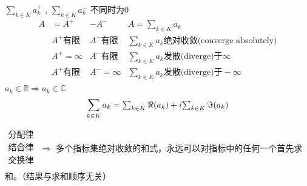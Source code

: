 \documentclass[mode=geye]{elegantnote}
\newcommand\tikznode[3][]%
{\tikz[remember picture,baseline=(#2.base)]
	\node[minimum size=0pt,inner sep=0pt,#1](#2){#3};%
}
\begin{document}
$ \sum_{k\in K} a_k^+ $ ,
$ \sum_{k\in K} a_k^- $ 不同时为0
\begin{equation*}
    \begin{array}{llll}
        A &= A^+ &- A^- & A =  \sum_{k\in K} a_k \\ 
          &A^+\text{有限} & A^-\text{有限}& \sum_{k\in K} a_k \text{绝对收敛(converge absolutely)} \\
          &A^+=\infty & A^-\text{有限}& \sum_{k\in K} a_k \text{发散(diverge)于}\infty \\
          &A^+\text{有限} & A^-=\infty& \sum_{k\in K} a_k \text{发散(diverge)于}-\infty \\
    \end{array}
\end{equation*}
$ a_k\in\mathbb{R} \Rightarrow a_k\in\mathbb{C} $ 
\begin{equation*}
    \sum_{k\in K} a_k =
    \tikznode{akRe}{$ \sum_{k\in K} \Re{(a_k)} $ } +
    i\tikznode{akIm}{$ \sum_{k\in K} \Im{(a_k)} $ }    
\end{equation*}


$\begin{array}{l}
    \text{分配律}\\
    \text{结合律}\\
    \text{交换律}\\
\end{array}$
$ \Rightarrow $ 多个指标集绝对收敛的和式，永远可以对指标中的任何一个首先求和。（结果与求和顺序无关）
\end{document}
